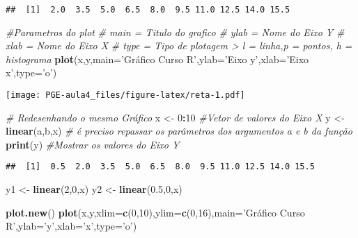 \documentclass[]{article}
\newenvironment{Shaded}{\begin{snugshade}}{\end{snugshade}}
\newcommand{\KeywordTok}[1]{\textcolor[rgb]{0.13,0.29,0.53}{\textbf{#1}}}
\newcommand{\DataTypeTok}[1]{\textcolor[rgb]{0.13,0.29,0.53}{#1}}
\newcommand{\DecValTok}[1]{\textcolor[rgb]{0.00,0.00,0.81}{#1}}
\newcommand{\FloatTok}[1]{\textcolor[rgb]{0.00,0.00,0.81}{#1}}
\newcommand{\StringTok}[1]{\textcolor[rgb]{0.31,0.60,0.02}{#1}}
\newcommand{\CommentTok}[1]{\textcolor[rgb]{0.56,0.35,0.01}{\textit{#1}}}
\newcommand{\OperatorTok}[1]{\textcolor[rgb]{0.81,0.36,0.00}{\textbf{#1}}}
\newcommand{\NormalTok}[1]{#1}
\begin{document}
\begin{verbatim}
##  [1]  2.0  3.5  5.0  6.5  8.0  9.5 11.0 12.5 14.0 15.5
\end{verbatim}

\begin{Shaded}
\begin{Highlighting}[]
\CommentTok{#Parametros do plot}
\CommentTok{#     main = Titulo do grafico}
\CommentTok{#     ylab = Nome do Eixo Y}
\CommentTok{#     xlab = Nome do Eixo X}
\CommentTok{#     type = Tipo de plotagem > l = linha,p = pontos, h = histograma}
\KeywordTok{plot}\NormalTok{(x,y,}\DataTypeTok{main=}\StringTok{'Gráfico Curso R'}\NormalTok{,}\DataTypeTok{ylab=}\StringTok{'Eixo y'}\NormalTok{,}\DataTypeTok{xlab=}\StringTok{'Eixo x'}\NormalTok{,}\DataTypeTok{type=}\StringTok{'o'}\NormalTok{)}
\end{Highlighting}
\end{Shaded}

\texttt{[image: PGE-aula4\_files/figure-latex/reta-1.pdf]}

\begin{Shaded}
\begin{Highlighting}[]
\CommentTok{# Redesenhando o mesmo Gráfico}
\NormalTok{x <-}\StringTok{ }\DecValTok{0}\OperatorTok{:}\DecValTok{10} \CommentTok{#Vetor de valores do Eixo X}
\NormalTok{y <-}\StringTok{ }\KeywordTok{linear}\NormalTok{(a,b,x) }\CommentTok{# é preciso repassar os parâmetros dos argumentos a e b da função}
\KeywordTok{print}\NormalTok{(y) }\CommentTok{#Mostrar os valores do Eixo Y}
\end{Highlighting}
\end{Shaded}

\begin{verbatim}
##  [1]  0.5  2.0  3.5  5.0  6.5  8.0  9.5 11.0 12.5 14.0 15.5
\end{verbatim}

\begin{Shaded}
\begin{Highlighting}[]
\NormalTok{y1 <-}\StringTok{ }\KeywordTok{linear}\NormalTok{(}\DecValTok{2}\NormalTok{,}\DecValTok{0}\NormalTok{,x)}
\NormalTok{y2 <-}\StringTok{ }\KeywordTok{linear}\NormalTok{(}\FloatTok{0.5}\NormalTok{,}\DecValTok{0}\NormalTok{,x)}

\KeywordTok{plot.new}\NormalTok{()}
\KeywordTok{plot}\NormalTok{(x,y,}\DataTypeTok{xlim=}\KeywordTok{c}\NormalTok{(}\DecValTok{0}\NormalTok{,}\DecValTok{10}\NormalTok{),}\DataTypeTok{ylim=}\KeywordTok{c}\NormalTok{(}\DecValTok{0}\NormalTok{,}\DecValTok{16}\NormalTok{),}\DataTypeTok{main=}\StringTok{'Gráfico Curso R'}\NormalTok{,}\DataTypeTok{ylab=}\StringTok{'y'}\NormalTok{,}\DataTypeTok{xlab=}\StringTok{'x'}\NormalTok{,}\DataTypeTok{type=}\StringTok{'o'}\NormalTok{)}
\end{Highlighting}
\end{Shaded}
\end{document}
